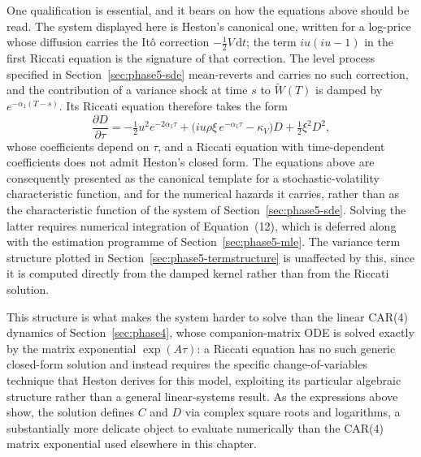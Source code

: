 \documentclass[11pt, a4paper, twoside]{article}
\begin{document}
One qualification is essential, and it bears on how the equations above should be read. The system displayed here is Heston's canonical one, written for a log-price whose diffusion carries the It\^o correction $-\tfrac12 V\,\mathrm dt$; the term $iu(iu-1)$ in the first Riccati equation is the signature of that correction. The level process specified in Section~\ref{sec:phase5-sde} mean-reverts and carries no such correction, and the contribution of a variance shock at time $s$ to $\widetilde W(T)$ is damped by $e^{-\alpha_1(T-s)}$. Its Riccati equation therefore takes the form
\begin{equation}
\frac{\partial D}{\partial\tau} = -\tfrac12 u^2 e^{-2\alpha_1\tau} + \bigl(iu\rho\xi\, e^{-\alpha_1\tau} - \kappa_V\bigr)D + \tfrac12 \xi^2 D^2,
\end{equation}
whose coefficients depend on $\tau$, and a Riccati equation with time-dependent coefficients does not admit Heston's closed form. The equations above are consequently presented as the canonical template for a stochastic-volatility characteristic function, and for the numerical hazards it carries, rather than as the characteristic function of the system of Section~\ref{sec:phase5-sde}. Solving the latter requires numerical integration of Equation~(12), which is deferred along with the estimation programme of Section~\ref{sec:phase5-mle}. The variance term structure plotted in Section~\ref{sec:phase5-termstructure} is unaffected by this, since it is computed directly from the damped kernel rather than from the Riccati solution.

This structure is what makes the system harder to solve than the linear CAR(4) dynamics of Section~\ref{sec:phase4}, whose companion-matrix ODE is solved exactly by the matrix exponential $\exp(A\tau)$: a Riccati equation has no such generic closed-form solution and instead requires the specific change-of-variables technique that Heston \citeyearpar{Heston1993} derives for this model, exploiting its particular algebraic structure rather than a general linear-systems result. As the expressions above show, the solution defines $C$ and $D$ via complex square roots and logarithms, a substantially more delicate object to evaluate numerically than the CAR(4) matrix exponential used elsewhere in this chapter.
\end{document}
